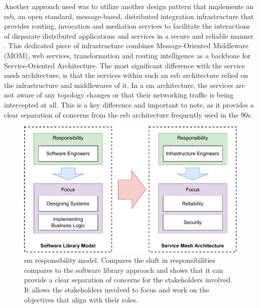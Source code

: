 Another approach used was to utilize another design pattern that implements an \gls{esb}, an open standard, message-based, distributed integration infrastructure that provides routing, invocation and mediation services to facilitate the interactions of disparate distributed applications and services in a secure and reliable manner \cite{menge2007enterprise}. This dedicated piece of infrastructure combines  Message-Oriented Middleware (MOM), web services, transformation and routing intelligence as a backbone for Service-Oriented Architecture.  The most significant difference with the service mesh architecture, is that the services within such an \gls{esb} architecture relied on the infrastructure and middlewares of it. In a \gls{sm} architecture, the services are not aware of any topology changes or that their networking traffic is being intercepted at all. This is a key difference and important to note, as it provides a clear separation of concerns from the \gls{esb} architecture frequently used in the 90s.

\begin{figure}[!t]
    \centering
    
    \includegraphics[width=0.8\linewidth]{2_background/figures/responsibility-model.pdf}

    \caption[Service Mesh Responsibility Model]{\Gls{sm} responsibility model. Compares the shift in responsibilities compares to the software library approach and shows that it can provide a clear separation of concerns for the stakeholders involved. It allows the stakeholders involved to focus and work on the objectives that align with their roles.}
    \label{fig:service-mesh-responsibility-model}
\end{figure}

